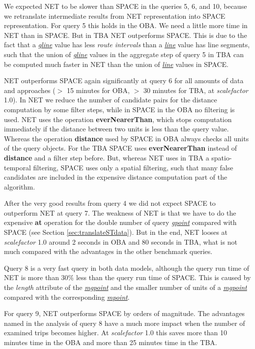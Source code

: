 \documentclass[a4paper]{article}
\newcommand{\op}[1]{\textbf{#1}}
\newcommand{\dt}[1]{\textsl{\underline{#1}}}
\begin{document}
We expected NET to be slower than SPACE in the queries 5, 6, and 10, because
we retranslate intermediate results from NET representation into SPACE
representation.
For query 5 this holds in the OBA. We need a little more time in NET
than in SPACE. But in TBA NET outperforms SPACE. This is due to the fact
that a \dt{gline} value has less \textit{route intervals}
than a \dt{line} value has line segments,
such that the union of \dt{gline} values in the aggregate step of query 5 in
TBA can be computed much faster in NET than the union of \dt{line} values in SPACE.

NET outperforms SPACE again significantly at query 6
for all amounts of data and approaches ($>$ 15 minutes for OBA, $>$
30 minutes for TBA, at \textit{scalefactor} 1.0). In NET we reduce the number of
candidate
pairs for the distance computation by some filter steps, while in SPACE
in the OBA no filtering is used. NET uses the operation \op{everNearerThan}, which
stops computation immediately if the distance between two units is less than the
query value. Whereas the operation \op{distance} used by SPACE in OBA always checks
all units of the query objects. For the TBA SPACE uses \op{everNearerThan}
instead of \op{distance} and a filter step before. But, whereas NET uses in TBA
a spatio-temporal filtering, SPACE uses only a spatial filtering, such that many
false candidates are included in the expensive distance computation part of the
algorithm.

After the very good results from query 4 we did not expect SPACE to outperform
NET at query 7. The weakness of NET is that we have to do the expensive \op{at} 
operation for the double number of query \dt{gpoint} compared with SPACE
(see Section \ref{sec:translateSTdata}).
But in the end, NET looses at \textit{scalefactor} 1.0 around 2 seconds in OBA
and 80 seconds in TBA, what is not much compared with the advantages in the other
benchmark queries.

Query 8 is a very fast query in both data models, although the query run time of
NET is more than 30\% less than the query run time of SPACE. This is caused by the
\textit{length} attribute of the \dt{mgpoint} and the smaller number of units of a
\dt{mgpoint} compared with the corresponding \dt{mpoint}.

For query 9, NET outperforms SPACE by orders of magnitude. The advantages
named in the analysis of query 8 have a much more impact
when the number of examined trips becomes higher. At \textit{scalefactor} 1.0
this saves
more than 10 minutes time in the OBA and more than 25 minutes time in the TBA.
\end{document}
